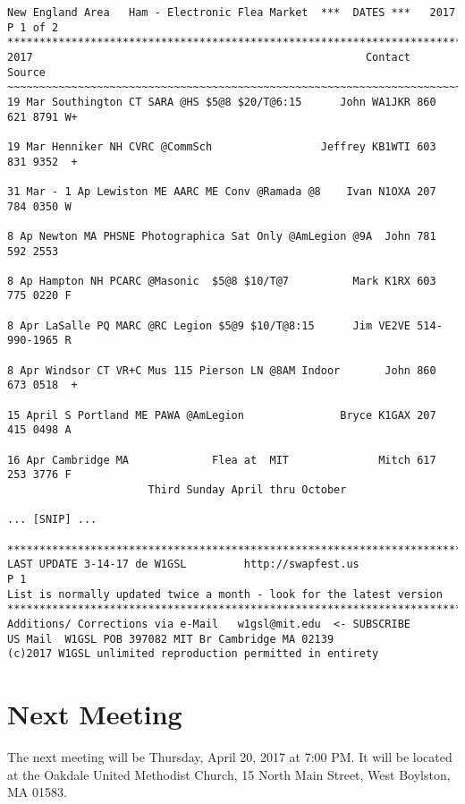 \documentclass[10pt,letterpaper]{article}
\begin{document}
\begin{tcolorbox}
\begin{verbatim}
New England Area   Ham - Electronic Flea Market  ***  DATES ***   2017 P 1 of 2
*******************************************************************************
2017                                                    Contact          Source
~~~~~~~~~~~~~~~~~~~~~~~~~~~~~~~~~~~~~~~~~~~~~~~~~~~~~~~~~~~~~~~~~~~~~~~~~~~~~~~
19 Mar Southington CT SARA @HS $5@8 $20/T@6:15      John WA1JKR 860 621 8791 W+

19 Mar Henniker NH CVRC @CommSch                 Jeffrey KB1WTI 603 831 9352  +

31 Mar - 1 Ap Lewiston ME AARC ME Conv @Ramada @8    Ivan N1OXA 207 784 0350 W

8 Ap Newton MA PHSNE Photographica Sat Only @AmLegion @9A  John 781 592 2553

8 Ap Hampton NH PCARC @Masonic  $5@8 $10/T@7          Mark K1RX 603 775 0220 F

8 Apr LaSalle PQ MARC @RC Legion $5@9 $10/T@8:15      Jim VE2VE 514-990-1965 R

8 Apr Windsor CT VR+C Mus 115 Pierson LN @8AM Indoor       John 860 673 0518  +

15 April S Portland ME PAWA @AmLegion               Bryce K1GAX 207 415 0498 A

16 Apr Cambridge MA             Flea at  MIT              Mitch 617 253 3776 F
                      Third Sunday April thru October

... [SNIP] ...

*******************************************************************************
LAST UPDATE 3-14-17 de W1GSL         http://swapfest.us                    P 1
List is normally updated twice a month - look for the latest version
*******************************************************************************
Additions/ Corrections via e-Mail   w1gsl@mit.edu  <- SUBSCRIBE
US Mail  W1GSL POB 397082 MIT Br Cambridge MA 02139
(c)2017 W1GSL unlimited reproduction permitted in entirety
\end{verbatim}
\end{tcolorbox}

\section{Next Meeting}
The next meeting will be Thursday, April 20, 2017 at 7:00 PM. It will be located at the Oakdale United Methodist Church, 15 North Main Street, West Boylston, MA 01583.\\
\end{document}
